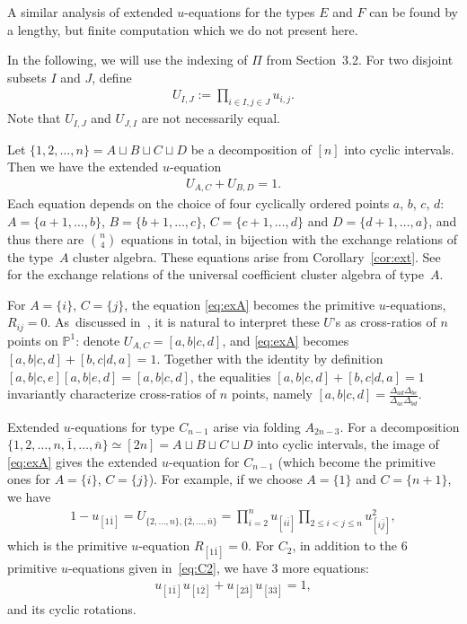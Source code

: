 \documentclass[10pt,a4paper]{amsart}
\renewcommand{\P}{{\mathbb P}}
\numberwithin{equation}{section}
\begin{document}
A similar analysis of extended $u$-equations for the types $E$ and $F$ can be found by a lengthy, but finite computation which we do not present here.

In the following, we will use the indexing of $\Pi$ from Section~3.2. For two disjoint subsets $I$ and $J$, define
\begin{gather}\label{eq:UIJ}
U_{I, J}:=\prod_{i \in I, j\in J} u_{i,j}.
\end{gather}
Note that $U_{I,J}$ and $U_{J,I}$ are not necessarily equal.

\medskip{} %
Let $\{1,2,\dots, n\} = A \sqcup B \sqcup C \sqcup D$ be a decomposition of $[n]$ into cyclic intervals.
Then we have the extended $u$-equation
\begin{gather}\label{eq:exA}
U_{A,C}+U_{B,D}=1.
\end{gather}
Each equation depends on the choice of four cyclically ordered points $a$, $b$, $c$, $d$: $A=\{a{+}1, \dots, b\}$, $B=\{b{+}1, \dots, c\}$, $C=\{c{+}1, \dots, d\}$ and $D=\{d{+}1, \dots, a\}$, and thus there are $\binom{n}{4}$ equations in total, in bijection with the exchange relations of the type~$A$ cluster algebra. These equations arise from Corollary~\ref{cor:ext}. See \cite[Proposition~7.2]{YZ} for the exchange relations of the universal coefficient cluster algebra of type~$A$.

For $A=\{i\}$, $C=\{j\}$, the equation \eqref{eq:exA} becomes the primitive $u$-equations, $R_{ij}=0$.
As~discussed in~\cite{AHLT,Brown}, it is natural to interpret these $U$'s as cross-ratios of $n$ points on $\P^1$: denote $U_{A,C}=[a,b|c,d]$, and \eqref{eq:exA} becomes $[a, b | c, d]+[b, c | d, a]=1$. Together with the identity by definition $[a, b | c, e] [a, b | e, d]=[a, b | c, d]$, the equalities $[a, b | c, d]+[b, c | d, a]=1$ invariantly characterize cross-ratios of $n$ points, namely $[a, b | c, d]=\frac{\Delta_{a d}\Delta_{ b c}}{\Delta_{a c}\Delta_{b d}}$.

\medskip{}
Extended $u$-equations for type $C_{n-1}$ arise via folding $A_{2n-3}$.
For a decomposition $\big\{1,2,\dots,n,\bar 1,\dots, \bar n\big\} \simeq [2n] = A\sqcup B\sqcup C\sqcup D$ into cyclic intervals, the image of \eqref{eq:exA} gives the extended $u$-equation for $C_{n{-}1}$ (which become the primitive ones for $A=\{i\}$, $C=\{j\}$). For example, if we choose $A=\{1\}$ and $C=\{n{+}1\}$, we have
\begin{gather*}
1-u_{[1 \bar 1]}=U_{\{2,\dots, n\}, \{\bar 2,\dots, \bar n\}}
=\prod_{i=2}^n u_{[i \bar i]} \prod_{2\leq i<j\leq n} u_{[i \bar j]}^2,
\end{gather*}
which is the primitive $u$-equation $R_{[1 \bar 1]} = 0$. For $C_2$, in addition to the $6$ primitive $u$-equations given in~\eqref{eq:C2}, we have $3$ more equations:
\begin{gather}\label{eq:exC2}
 u_{[1 \bar{1}]} u_{[1 \bar{2}]}+ u_{[2 \bar{3}]} u_{[3 \bar{3}]}=1,
 \end{gather}
and its cyclic rotations.
\end{document}
